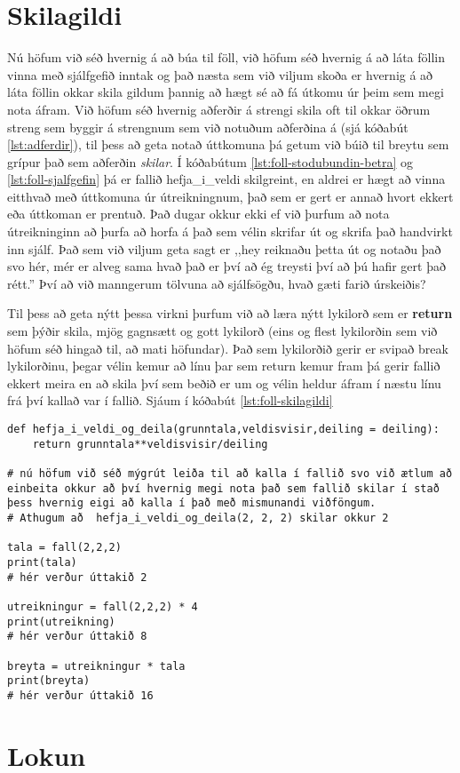 \section{Skilagildi}\label{uk:skilagildi}
Nú höfum við séð hvernig á að búa til föll, við höfum séð hvernig á að láta föllin vinna með sjálfgefið inntak og það næsta sem við viljum skoða er hvernig á að láta föllin okkar skila gildum þannig að hægt sé að fá útkomu úr þeim sem megi nota áfram.
Við höfum séð hvernig aðferðir á strengi skila oft til okkar öðrum streng sem byggir á strengnum sem við notuðum aðferðina á (sjá kóðabút \ref{lst:adferdir}), til þess að geta notað úttkomuna þá getum við búið til breytu sem grípur það sem aðferðin \textit{skilar}.
Í kóðabútum \ref{lst:foll-stodubundin-betra} og \ref{lst:foll-sjalfgefin} þá er fallið hefja\_i\_veldi skilgreint, en aldrei er hægt að vinna eitthvað með úttkomuna úr útreikningnum, það sem er gert er annað hvort ekkert eða úttkoman er prentuð.
Það dugar okkur ekki ef við þurfum að nota útreikninginn að þurfa að horfa á það sem vélin skrifar út og skrifa það handvirkt inn sjálf.
Það sem við viljum geta sagt er ,,hey reiknaðu þetta út og notaðu það svo hér, mér er alveg sama hvað það er því að ég treysti því að þú hafir gert það rétt.''
Því að við manngerum tölvuna að sjálfsögðu, hvað gæti farið úrskeiðis?

Til þess að geta nýtt þessa virkni þurfum við að læra nýtt lykilorð sem er \textbf{return} sem þýðir skila, mjög gagnsætt og gott lykilorð (eins og flest lykilorðin sem við höfum séð hingað til, að mati höfundar).
Það sem lykilorðið gerir er svipað break lykilorðinu, þegar vélin kemur að línu þar sem return kemur fram þá gerir fallið ekkert meira en að skila því sem beðið er um og vélin heldur áfram í næstu línu frá því kallað var í fallið.
Sjáum í kóðabút \ref{lst:foll-skilagildi}

\begin{lstlisting}[caption=Stöðubundin viðföng kynnt, label=lst:foll-skilagildi]
def hefja_i_veldi_og_deila(grunntala,veldisvisir,deiling = deiling):	
	return grunntala**veldisvisir/deiling
	
# nú höfum við séð mýgrút leiða til að kalla í fallið svo við ætlum að einbeita okkur að því hvernig megi nota það sem fallið skilar í stað þess hvernig eigi að kalla í það með mismunandi viðföngum.
# Athugum að  hefja_i_veldi_og_deila(2, 2, 2) skilar okkur 2

tala = fall(2,2,2)
print(tala)
# hér verður úttakið 2

utreikningur = fall(2,2,2) * 4
print(utreikning)
# hér verður úttakið 8

breyta = utreikningur * tala
print(breyta)
# hér verður úttakið 16
\end{lstlisting}
 

\section{Lokun}